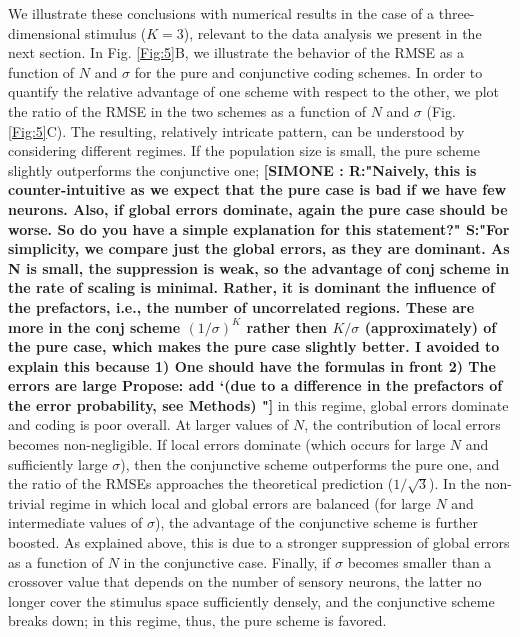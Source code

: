 \documentclass[a4paper]{article}%
\begin{document}
We illustrate these conclusions with numerical results in the case of a
three-dimensional stimulus ($K=3$), relevant to the data analysis we present
in the next section. In Fig. \ref{Fig:5}B, we illustrate the behavior of the RMSE as a function of $N$ and $\sigma$ for the pure and
conjunctive coding schemes. In order to quantify the relative advantage of one
scheme with respect to the other, we plot the ratio of the RMSE in the two
schemes as a function of $N$ and $\sigma$ (Fig. \ref{Fig:5}C). The resulting,
relatively intricate pattern, can be understood by considering different
regimes. If the population size is small, the pure scheme slightly outperforms
the conjunctive one;
\textbf{[SIMONE : R:"Naively, this is counter-intuitive as we expect that the pure case is bad if we have few neurons. Also, if global errors dominate, again the pure case should be worse.
So do you have a simple explanation for this statement?" S:"For simplicity, we compare just the global errors, as they are dominant. As N is small, the suppression is weak, so the advantage of conj scheme in the rate of scaling is minimal. Rather, it is dominant the influence of the prefactors, i.e., the number of uncorrelated regions. These are more in the conj scheme $(1/\sigma)^K$ rather then $K/\sigma$ (approximately) of the pure case, which makes the pure case slightly better. I avoided to explain this  because 1) One should have the formulas in front 2) The errors are large Propose: add `(due to a difference in the prefactors of the error probability, see Methods) "]} 
in this regime, global errors dominate and coding is poor overall. At larger values of
$N$, the contribution of local errors becomes non-negligible. If local errors
dominate (which occurs for large $N$ and sufficiently large $\sigma$), then
the conjunctive scheme outperforms the pure one, and the ratio of the RMSEs
approaches the theoretical prediction ($1/\sqrt{3}$). In the non-trivial
regime in which local and global errors are balanced (for large $N$ and
intermediate values of $\sigma$), the advantage of the conjunctive scheme is
further boosted. As explained above, this is due to a stronger suppression of
global errors as a function of $N$ in the conjunctive case. Finally, if
$\sigma$ becomes smaller than a crossover value that depends on the number of
sensory neurons, the latter no longer cover the stimulus space sufficiently
densely, and the conjunctive scheme breaks down; in this regime, thus, the
pure scheme is favored.
\end{document}
